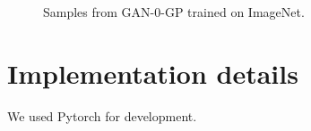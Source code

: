 \documentclass{article} %
\begin{document}
\begin{figure}[h!]
\centering
{} \\
 \\

\caption{Samples from GAN-0-GP trained on ImageNet.}
\end{figure}

\section{Implementation details}
We used Pytorch \citep{pytorch} for development.
\end{document}
